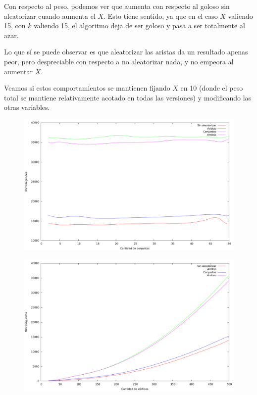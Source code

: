 \vspace*{0.5cm}

Con respecto al peso, podemos ver que aumenta con respecto al goloso sin
aleatorizar cuando aumenta el $X$. Esto tiene sentido, ya que en el caso $X$
valiendo 15, con $k$ valiendo 15, el algoritmo deja de ser goloso y pasa a ser
totalmente al azar.

Lo que sí se puede observar es que aleatorizar las aristas da un resultado
apenas peor, pero despreciable con respecto a no aleatorizar nada, y no empeora
al aumentar $X$.

\vspace*{0.5cm}

Veamos si estos comportamientos se mantienen fijando $X$ en 10 (donde el peso
total se mantiene relativamente acotado en todas las versiones) y modificando
las otras variables.

\begin{figure}[H]
  \begin{center}
    \includegraphics[scale=0.35]{imagenes/grasp-goloso-k-tiempo.png}
  \end{center}
\end{figure}

\begin{figure}[H]
  \begin{center}
    \includegraphics[scale=0.35]{imagenes/grasp-goloso-n-tiempo.png}
  \end{center}
\end{figure}

